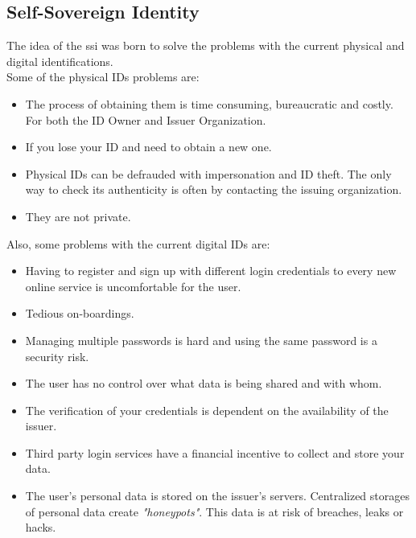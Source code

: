 \subsection{Self-Sovereign Identity}
The idea of the \acrlong{ssi} was born to solve the problems with the current physical and digital identifications.\\
Some of the physical IDs problems are:
\begin{itemize}
    \item The process of obtaining them is time consuming, bureaucratic and costly. For both the ID Owner and Issuer Organization.
    \item If you lose your ID and need to obtain a new one.
    \item Physical IDs can be defrauded with impersonation and ID theft. The only way to check its authenticity is often by contacting the issuing organization.
    \item They are not private.
\end{itemize}
Also, some problems with the current digital IDs are:
\begin{itemize}
    \item Having to register and sign up with different login credentials to every new online service is uncomfortable for the user.
    \item Tedious on-boardings.
    \item Managing multiple passwords is hard and using the same password is a security risk.
    \item The user has no control over what data is being shared and with whom.
    \item The verification of your credentials is dependent on the availability of the issuer.
    \item Third party login services have a financial incentive to collect and store your data.
    \item The user's personal data is stored on the issuer's servers. Centralized storages of personal data create \textit{"honeypots"}. This data is at risk of breaches, leaks or hacks.
\end{itemize}

